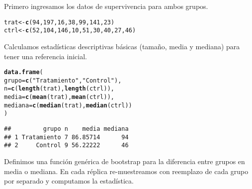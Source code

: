 \documentclass[paper=letter, fontsize=11pt, draft=false]{scrartcl}\usepackage[]{graphicx}\usepackage[]{xcolor}
\makeatletter
\newcommand{\hlnum}[1]{\textcolor[rgb]{0.686,0.059,0.569}{#1}}%
\newcommand{\hlsng}[1]{\textcolor[rgb]{0.192,0.494,0.8}{#1}}%
\newcommand{\hldef}[1]{\textcolor[rgb]{0.345,0.345,0.345}{#1}}%
\newcommand{\hlkwb}[1]{\textcolor[rgb]{0.69,0.353,0.396}{#1}}%
\newcommand{\hlkwc}[1]{\textcolor[rgb]{0.333,0.667,0.333}{#1}}%
\newcommand{\hlkwd}[1]{\textcolor[rgb]{0.737,0.353,0.396}{\textbf{#1}}}%
\newenvironment{kframe}{%
 \def\at@end@of@kframe{}%
 \ifinner\ifhmode%
  \def\at@end@of@kframe{\end{minipage}}%
  \begin{minipage}{\columnwidth}%
 \fi\fi%
 \def\FrameCommand##1{\hskip\@totalleftmargin \hskip-\fboxsep
 \colorbox{shadecolor}{##1}\hskip-\fboxsep
     \hskip-\linewidth \hskip-\@totalleftmargin \hskip\columnwidth}%
 \MakeFramed {\advance\hsize-\width
   \@totalleftmargin\z@ \linewidth\hsize
   \@setminipage}}%
 {\par\unskip\endMakeFramed%
 \at@end@of@kframe}
\newenvironment{knitrout}{}{} %
\numberwithin{equation}{problemcounter} %
\numberwithin{figure}{problemcounter} %
\numberwithin{table}{problemcounter} %
\numberwithin{subsection}{problemcounter}
\makeatother
\begin{document}
Primero ingresamos los datos de supervivencia para ambos grupos.

\begin{knitrout}
\color{fgcolor}\begin{kframe}
\begin{alltt}
\hldef{trat} \hlkwb{<-} \hlkwd{c}\hldef{(}\hlnum{94}\hldef{,} \hlnum{197}\hldef{,} \hlnum{16}\hldef{,} \hlnum{38}\hldef{,} \hlnum{99}\hldef{,} \hlnum{141}\hldef{,} \hlnum{23}\hldef{)}
\hldef{ctrl} \hlkwb{<-} \hlkwd{c}\hldef{(}\hlnum{52}\hldef{,} \hlnum{104}\hldef{,} \hlnum{146}\hldef{,} \hlnum{10}\hldef{,} \hlnum{51}\hldef{,} \hlnum{30}\hldef{,} \hlnum{40}\hldef{,} \hlnum{27}\hldef{,} \hlnum{46}\hldef{)}
\end{alltt}
\end{kframe}
\end{knitrout}

Calculamos estadísticas descriptivas básicas (tamaño, media y mediana) para tener una referencia inicial.

\begin{knitrout}
\color{fgcolor}\begin{kframe}
\begin{alltt}
\hlkwd{data.frame}\hldef{(}
    \hlkwc{grupo} \hldef{=} \hlkwd{c}\hldef{(}\hlsng{"Tratamiento"}\hldef{,} \hlsng{"Control"}\hldef{),}
    \hlkwc{n} \hldef{=} \hlkwd{c}\hldef{(}\hlkwd{length}\hldef{(trat),} \hlkwd{length}\hldef{(ctrl)),}
    \hlkwc{media} \hldef{=} \hlkwd{c}\hldef{(}\hlkwd{mean}\hldef{(trat),} \hlkwd{mean}\hldef{(ctrl)),}
    \hlkwc{mediana} \hldef{=} \hlkwd{c}\hldef{(}\hlkwd{median}\hldef{(trat),} \hlkwd{median}\hldef{(ctrl))}
\hldef{)}
\end{alltt}
\begin{verbatim}
##         grupo n    media mediana
## 1 Tratamiento 7 86.85714      94
## 2     Control 9 56.22222      46
\end{verbatim}
\end{kframe}
\end{knitrout}

Definimos una función genérica de bootstrap para la diferencia entre grupos en media o mediana. En cada réplica re-muestreamos con reemplazo de cada grupo por separado y computamos la estadística.
\end{document}
